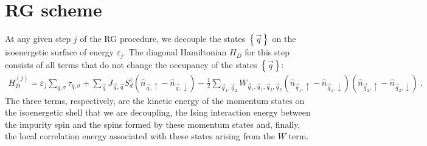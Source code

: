 \documentclass{revtex4-2}
\begin{document}
\section{RG scheme}
At any given step \(j\) of the RG procedure, we decouple the states \(\left\{ \vec q \right\} \) on the isoenergetic surface of energy \(\varepsilon_j\). The diagonal Hamiltonian \(H_D\) for this step consists of all terms that do not change the occupancy of the states \(\left\{\vec q\right\}\):
\begin{equation}\begin{aligned}
	H_D^{(j)} = \varepsilon_j\sum_{q,\sigma}\tau_{q,\sigma} + \sum_{\vec q}J_{\vec q, \vec q}S_d^z\left(\hat n_{\vec q, \uparrow} - \hat n_{\vec q, \downarrow}\right) - \frac{1}{2}\sum_{\vec q_1, \vec q_2}W_{\vec q_1, \vec q_1, \vec q_2, \vec q_2}\left(\hat n_{\vec q_1, \uparrow} - \hat n_{\vec q_1, \downarrow}\right)\left(\hat n_{\vec q_2, \uparrow} - \hat n_{\vec q_2, \downarrow}\right)~.
\end{aligned}\end{equation}
The three terms, respectively, are the kinetic energy of the momentum states on the isoenergetic shell that we are decoupling, the Ising interaction energy between the impurity spin and the spins formed by these momentum states and, finally, the local correlation energy associated with these states arising from the \(W\) term.
\end{document}
